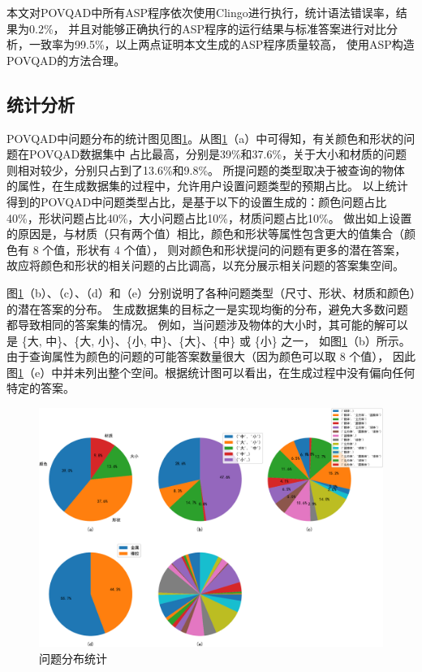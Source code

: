 本文对POVQAD中所有ASP程序依次使用Clingo进行执行，统计语法错误率，结果为0.2\%，
并且对能够正确执行的ASP程序的运行结果与标准答案进行对比分析，一致率为99.5\%，以上两点证明本文生成的ASP程序质量较高，
使用ASP构造POVQAD的方法合理。
\subsection{统计分析}
POVQAD中问题分布的统计图见图\ref{fig:question_statistics}。从图\ref{fig:question_statistics}（a）中可得知，有关颜色和形状的问题在POVQAD数据集中
占比最高，分别是39\%和37.6\%，关于大小和材质的问题则相对较少，分别只占到了13.6\%和9.8\%。
所提问题的类型取决于被查询的物体的属性，在生成数据集的过程中，允许用户设置问题类型的预期占比。
以上统计得到的POVQAD中问题类型占比，是基于以下的设置生成的：颜色问题占比40\%，形状问题占比40\%，大小问题占比10\%，材质问题占比10\%。
做出如上设置的原因是，与材质（只有两个值）相比，颜色和形状等属性包含更大的值集合（颜色有 8 个值，形状有 4 个值），
则对颜色和形状提问的问题有更多的潜在答案，故应将颜色和形状的相关问题的占比调高，以充分展示相关问题的答案集空间。

图\ref{fig:question_statistics}（b）、（c）、（d）和（e）分别说明了各种问题类型（尺寸、形状、材质和颜色）的潜在答案的分布。
生成数据集的目标之一是实现均衡的分布，避免大多数问题都导致相同的答案集的情况。
例如，当问题涉及物体的大小时，其可能的解可以是
 \{大, 中\}、\{大, 小\}、\{小, 中\}、\{大\}、\{中\} 或 \{小\} 之一，
 如图\ref{fig:question_statistics}（b）所示。由于查询属性为颜色的问题的可能答案数量很大（因为颜色可以取 8 个值），
 因此图\ref{fig:question_statistics}（e）中并未列出整个空间。根据统计图可以看出，在生成过程中没有偏向任何特定的答案。
\begin{figure}[h]
    \centering
    \includegraphics[scale=0.45]{figures/question_distribution-crop.pdf}
    \caption{问题分布统计}
    \label{fig:question_statistics}
\end{figure}

